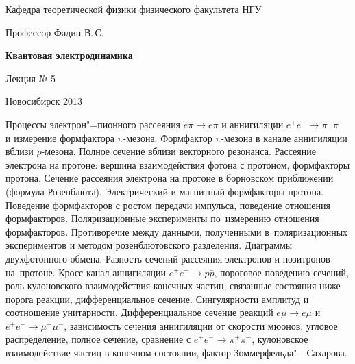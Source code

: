 \documentclass[12pt,pagesize,paper=192mm:108mm]{scrbook}
\begin{document}
\begin{titlepage}
\begin{center}
    Кафедра теоретической физики физического факультета НГУ
    \medskip

    \Large
    Профессор Фадин В.\,С.
    \bigskip

    \huge
    \textbf{Квантовая электродинамика}
    \bigskip

    \Large
    Лекция № 5
    \vfill

    \normalsize
    \vfill

    \normalsize \ccbysa\hspace{0.5em}  Новосибирск 2013
  \end{center}
\end{titlepage}
\vspace*{-1em}
\begin{center}
\vfill
  \begin{minipage}{0.85\linewidth}
    Процессы электрон"=пионного рассеяния $e \pi \to e \pi$ и
    аннигиляции $e^+e^-\to\pi^+\pi^-$ и измерение формфактора
    $\pi$-мезона. Формфактор $\pi$-мезона в канале аннигиляции вблизи
    $\rho$-мезона. Полное сечение вблизи векторного резонанса.
    Рассеяние электрона на протоне: вершина взаимодействия фотона с
    протоном, формфакторы протона. Сечение рассеяния электрона на
    протоне в борновском приближении (формула
    Розенблюта). Электрический и магнитный формфакторы
    протона. Поведение формфакторов с ростом передачи импульса,
    поведение отношения формфакторов. Поляризационные эксперименты
    по~измерению отношения формфакторов. Противоречие между данными,
    полученными в~поляризационных экспериментов и методом
    розенблютовского разделения.  Диаграммы двухфотонного
    обмена. Разность сечений рассеяния электронов и позитронов
    на~протоне. Кросс-канал аннигиляции $e^+e^- \to p\bar{p}$,
    пороговое поведению сечений, роль кулоновского взаимодействия
    конечных частиц, связанные состояния ниже порога реакции,
    дифференциальное сечение. Сингулярности амплитуд и соотношение
    унитарности.  Дифференциальное сечение реакций $e\mu \to e\mu$ и
    $e^+e^- \to \mu^+\mu^-$, зависимость сечения аннигиляции от
    скорости мюонов, угловое распределение, полное сечение, сравнение
    с $e^+e^- \to \pi^+\pi^-$, кулоновское взаимодействие частиц в
    конечном состоянии, фактор Зоммерфельда"--~Сахарова.
  \end{minipage}
  \vfill

\end{center}
\end{document}
